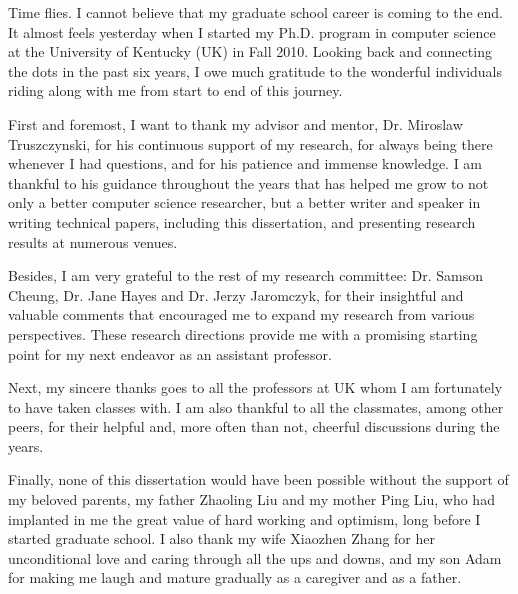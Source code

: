 
Time flies.  I cannot believe that my graduate school career is coming to the end.
It almost feels yesterday when I started my Ph.D. program in computer science at the
University of Kentucky (UK) in Fall 2010.
Looking back and connecting the dots in the past six years,
I owe much gratitude to the wonderful individuals riding along with me from start
to end of this journey.

First and foremost, I want to thank my advisor and mentor, Dr. Miroslaw Truszczynski,
for his continuous support of my research, for always being there whenever
I had questions, and for his patience and immense knowledge.
I am thankful to his guidance throughout the years that has helped me
grow to not only a better computer science researcher, but a better
writer and speaker in writing technical papers, including this dissertation,
and presenting research results at numerous venues.

Besides, I am very grateful to the rest of my research committee:
Dr. Samson Cheung, Dr. Jane Hayes and Dr. Jerzy Jaromczyk,
for their insightful and valuable comments that encouraged me
to expand my research from various perspectives.
These research directions provide me with a promising
starting point for my next endeavor as an assistant
professor.

Next, my sincere thanks goes to all the professors at UK
whom I am fortunately to have taken classes with.
I am also thankful to all the classmates, among
other peers, for their helpful and, more often than
not, cheerful discussions during the years.

Finally, none of this dissertation would have been possible
without the support of my beloved parents, my father
Zhaoling Liu and my mother Ping Liu, who had implanted
in me the great value of hard working and optimism, long
before I started graduate school.
I also thank my wife Xiaozhen Zhang
for her unconditional love and caring through all
the ups and downs, and my son Adam for
making me laugh and mature gradually as a caregiver
and as a father.

